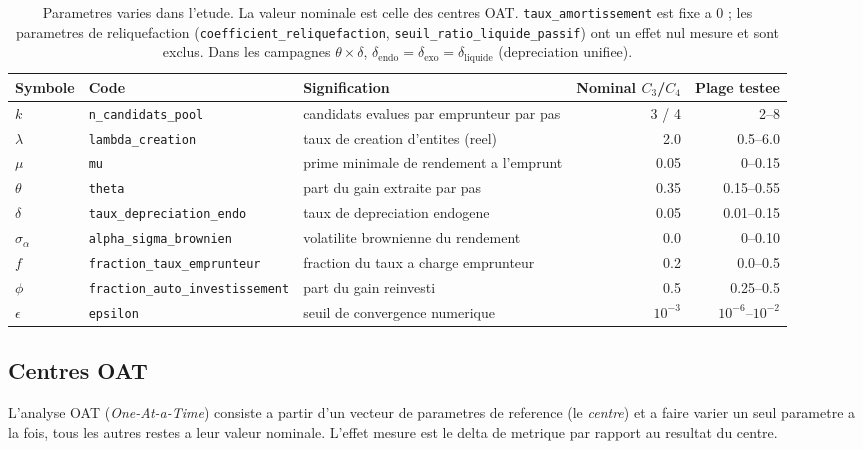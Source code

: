 \documentclass[11pt,a4paper]{article}
\begin{document}
\begin{table}[H]
\centering
\small
\begin{tabularx}{\linewidth}{llXrr}
\toprule
Symbole & Code & Signification & Nominal $C_3$/$C_4$ & Plage testee \\
\midrule
$k$ & \texttt{n\_candidats\_pool} & candidats evalues par emprunteur par pas & 3 / 4 & 2--8 \\
$\lambda$ & \texttt{lambda\_creation} & taux de creation d'entites (reel) & 2.0 & 0.5--6.0 \\
$\mu$ & \texttt{mu} & prime minimale de rendement a l'emprunt & 0.05 & 0--0.15 \\
$\theta$ & \texttt{theta} & part du gain extraite par pas & 0.35 & 0.15--0.55 \\
$\delta$ & \texttt{taux\_depreciation\_endo} & taux de depreciation endogene & 0.05 & 0.01--0.15 \\
$\sigma_\alpha$ & \texttt{alpha\_sigma\_brownien} & volatilite brownienne du rendement & 0.0 & 0--0.10 \\
$f$ & \texttt{fraction\_taux\_emprunteur} & fraction du taux a charge emprunteur & 0.2 & 0.0--0.5 \\
$\phi$ & \texttt{fraction\_auto\_investissement} & part du gain reinvesti & 0.5 & 0.25--0.5 \\
$\epsilon$ & \texttt{epsilon} & seuil de convergence numerique & $10^{-3}$ & $10^{-6}$--$10^{-2}$ \\
\bottomrule
\end{tabularx}
\caption{Parametres varies dans l'etude. La valeur nominale est celle des
centres OAT. \texttt{taux\_amortissement} est fixe a 0 ; les parametres de
reliquefaction (\texttt{coefficient\_reliquefaction}, \texttt{seuil\_ratio\_liquide\_passif})
ont un effet nul mesure et sont exclus. Dans les campagnes
\(\theta\times\delta\), \(\delta_{\mathrm{endo}} = \delta_{\mathrm{exo}} = \delta_{\mathrm{liquide}}\)
(depreciation unifiee).}
\end{table}

\subsection*{Centres OAT}

L'analyse OAT (\emph{One-At-a-Time}) consiste a partir d'un vecteur de
parametres de reference (le \emph{centre}) et a faire varier un seul parametre
a la fois, tous les autres restes a leur valeur nominale. L'effet mesure est
le delta de metrique par rapport au resultat du centre.
\end{document}
